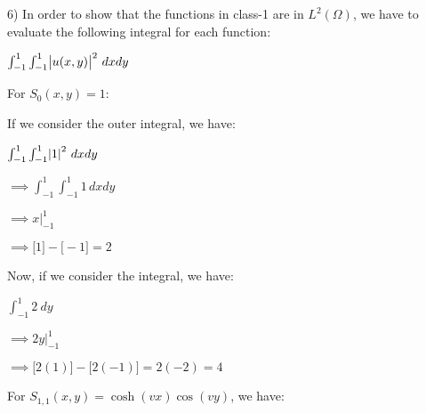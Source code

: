 \documentclass[executivepaper]{article}
\begin{document}
\begin{flushleft}

6) In order to show that the functions in class-1 are in $L^2(\Omega)$, we have to evaluate the following integral for each function:

\begin{center}

$\int_{-1}^{1} \int_{-1}^{1}\abs{u(x,y)}^2 \,dx dy$

\end{center}

\vspace{2mm}

For $S_{0}(x,y)=1$:

\vspace{3mm}

If we consider the outer integral, we have:

\begin{center}

$\int_{-1}^{1} \int_{-1}^{1}\abs{1}^2 \,dx dy$

\vspace{1mm}

$\implies \int_{-1}^{1} \int_{-1}^{1} 1 \,dx dy$

\vspace{1mm}

$\implies x \Big|_{-1}^{1}$

\vspace{1mm}

$\implies \bigg[1\bigg]-\bigg[-1\bigg]=2$

\end{center}

Now, if we consider the integral, we have:

\begin{center}

$\int_{-1}^{1} 2  \ dy$

\vspace{1mm}

$\implies 2y \Big|_{-1}^{1}$

\vspace{1mm}

$\implies \bigg[2(1)\bigg]-\bigg[2(-1)\bigg]=2(-2)=4$

\end{center}

\vspace{3mm}

For $S_{1,1}(x,y)=\cosh(vx)\cos(vy)$, we have:

\begin{center}


\end{center}
\end{flushleft}
\end{document}
